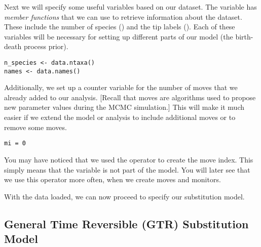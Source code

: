 Next we will specify some useful variables based on our dataset. The variable  has \textit{member functions} that we can use to retrieve information about the dataset. 
These include the number of species () and the tip labels ().
Each of these variables will be necessary for setting up different parts of our model (\EG the birth-death process prior).
{\tt \begin{snugshade*}
\begin{lstlisting}
n_species <- data.ntaxa()
names <- data.names()	
\end{lstlisting}
\end{snugshade*}}

Additionally, we set up a counter variable for the number of moves that we already added to our analysis.
[Recall that moves are algorithms used to propose new parameter values during the MCMC simulation.]
This will make it much easier if we extend the model or analysis to include additional moves or to remove some moves.
{\tt \begin{snugshade*}
\begin{lstlisting}
mi = 0 
\end{lstlisting}
\end{snugshade*}}
You may have noticed that we used the \cl{=} operator to create the move index.
This simply means that the variable is not part of the model.
You will later see that we use this operator more often, \EG when we create moves and monitors.

With the data loaded, we can now proceed to specify our substitution model.



\subsection{General Time Reversible (GTR) Substitution Model}


